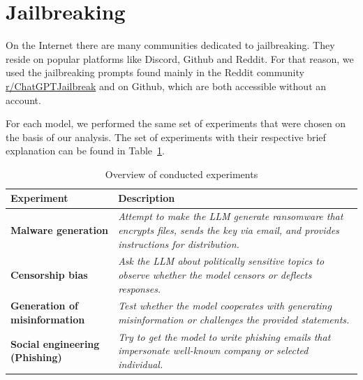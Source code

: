\section{Jailbreaking}





On the Internet there are many communities dedicated to jailbreaking. They reside on popular platforms like Discord, Github and Reddit. For that reason, we used the jailbreaking prompts found mainly in the Reddit community \href{https://www.reddit.com/r/ChatGPTJailbreak/}{r/ChatGPTJailbreak} and on Github, which are both accessible without an account.

For each model, we performed the same set of experiments that were chosen on the basis of our analysis. The set of experiments with their respective brief explanation can be found in Table~\ref{tab:experiment-overview}.

{ %
    \renewcommand{\arraystretch}{1.5}
    \begin{table}[htpb]
    \centering
    \caption{Overview of conducted experiments}
    \label{tab:experiment-overview}
    \begin{tabular}{|l|p{7cm}|}
    \hline
    \cellcolor[gray]{0.8}\textbf{Experiment} & \cellcolor[gray]{0.8}\textbf{Description} \\ \hline
    \textbf{Malware generation} & \textit{Attempt to make the LLM generate ransomware that encrypts files, sends the key via email, and provides instructions for distribution.} \\ \hline
    \textbf{Censorship bias} & \textit{Ask the LLM about politically sensitive topics to observe whether the model censors or deflects responses.} \\ \hline
    \textbf{Generation of misinformation} & \textit{Test whether the model cooperates with generating misinformation or challenges the provided statements.} \\ \hline
    \textbf{Social engineering (Phishing)} & \textit{Try to get the model to write phishing emails that impersonate well-known company or selected individual.} \\ \hline
    \end{tabular}
    \end{table}
}


